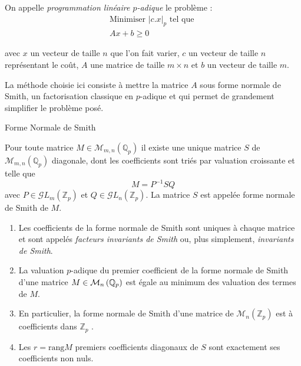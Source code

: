 	On appelle \textit{programmation linéaire $p$-adique} le problème :
\begin{equation}
	  \tag{PLp}
\begin{matrix}
	\text{Minimiser } |c.x|_p \text{ tel que }\\
	Ax + b \ge 0
 \end{matrix}
	    \label{eqn:Proglinp}
\end{equation}

avec $x$ un vecteur de taille $n$ que l'on fait varier, $c$ un vecteur de taille $n$ représentant le coût, $A$ une matrice de taille $m \times n $ et $b$ un vecteur de taille $m$.

La méthode choisie ici consiste à mettre la matrice $A$ sous forme normale de Smith, un factorisation classique en $p$-adique et qui permet de grandement simplifier le problème posé.

\begin{definition}
	Forme Normale de Smith

	Pour toute matrice $M \in \mathcal{M}_{m,n}\left( \mathbb{Q}_{ p }  \right) $ il existe une unique matrice $S$ de $\mathcal{M}_{m,n}\left( \mathbb{Q}_{ p }  \right) $ diagonale, dont les coefficients sont triés par valuation croissante et telle que
	\[
		M = P^{-1} S Q
	\]
 avec $P \in \mathcal{G}L_m\left( \mathbb{Z}_p \right)$ et $ Q \in \mathcal{G}L_n\left( \mathbb{Z}_p \right)$. La matrice $S$ est appelée forme normale de Smith de $M$.
\end{definition}

\begin{remarques}

	
	\begin{enumerate}[label=\roman*.]
		\item Les coefficients de la forme normale de Smith sont uniques à chaque matrice et sont appelés \textit{facteurs invariants de Smith} ou, plus simplement, \textit{invariants de Smith}.
		\item La valuation $p$-adique du premier coefficient de la forme normale de Smith d'une matrice $M \in \mathcal{M}_n \left( \mathbb{Q}_p \right) $ est égale au minimum des valuation des termes de $M$.
		\item En particulier, la forme normale de Smith d'une matrice de $\mathcal{M}_n \left( \mathbb{Z}_p \right) $ est à coefficients dans $\mathbb{Z}_p$ .
		\item Les $r = \text{rang} M$ premiers coefficients diagonaux de $S$ sont exactement ses coefficients non nuls.  
	\end{enumerate}

\end{remarques}

